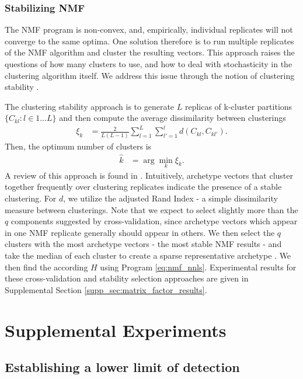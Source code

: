 \subsubsection{Stabilizing NMF}

The NMF program is non-convex, and, empirically, individual replicates will not converge to the same optima.
One solution therefore is to run multiple replicates of the NMF algorithm and cluster the resulting vectors.
This approach raises the questions of how many clusters to use, and how to deal with stochasticity in the clustering algorithm itself.
We address this issue through the notion of clustering stability \citep{Von_Luxburg2010-lu}.

The clustering stability approach is to generate $L$ replicas of k-cluster partitions $\{C_{kl} : l \in 1 \dots L\}$ and then compute the average dissimilarity between clusterings
\begin{align*}
\xi_k &= \frac{2}{L(L - 1)} \sum_{l = 1}^{L} \sum_{l'= 1}^{l}  d(C_{kl}, C_{kl'}).
\end{align*}
Then, the optimum number of clusters is 
\begin{align*}
\hat k &= \arg \min_k \xi_k.
\end{align*}
A review of this approach is found in \citet{Von_Luxburg2010-qe}.
Intuitively, archetype vectors that cluster together frequently over clustering replicates indicate the presence of a stable clustering.
For $d$, we utilize the adjusted Rand Index - a simple dissimilarity measure between clusterings.
Note that we expect to select slightly more than the $q$ components suggested by cross-validation, since archetype vectors which appear in one NMF replicate generally should appear in others.
We then select the $q$ clusters with the most archetype vectors - the most stable NMF results - and take the median of each cluster to create a sparse representative archetype \citet{Wu2016-gg, Kotliar2019-yj}.
We then find the according $H$ using Program \ref{eq:nmf_nnls}.
Experimental results for these cross-validation and stability selection approaches are given in Supplemental Section \ref{supp_sec:matrix_factor_results}.

\newpage

\section{Supplemental Experiments}
\label{supp_sec:exp}

\subsection{Establishing a lower limit of detection}
\label{supp:exp_lower}

